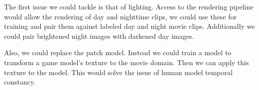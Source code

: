 The first issue we could tackle is that of lighting.
Access to the rendering pipeline would allow the rendering of day and nighttime clips, we could use these for training and pair them against labeled day and night movie clips.
Additionally we could pair brightened night images with darkened day images.

Also, we could replace the patch model.
Instead we could train a model to transform a game model's texture to the movie domain.
Then we can apply this texture to the model.
This would solve the issue of human model temporal constancy.